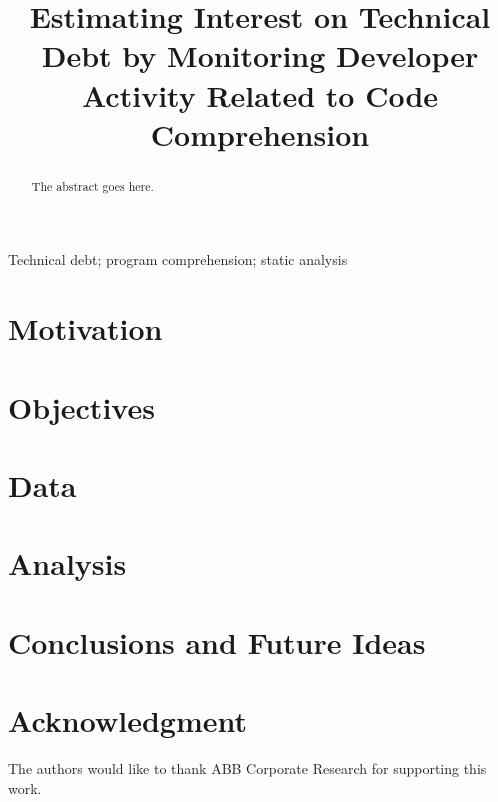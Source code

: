 \documentclass[conference]{IEEEtran}
\begin{document}
\title{Estimating Interest on Technical Debt by Monitoring Developer Activity Related to Code Comprehension}

\author{
\and
{}
}

\maketitle

\begin{abstract}
The abstract goes here.
\end{abstract}

\begin{IEEEkeywords}
Technical debt; program comprehension; static analysis
\end{IEEEkeywords}

\section{Motivation}


\section{Objectives}


\section{Data}


\section{Analysis}


\section{Conclusions and Future Ideas}


\section*{Acknowledgment}
The authors would like to thank ABB Corporate Research for supporting this work.



\end{document}
